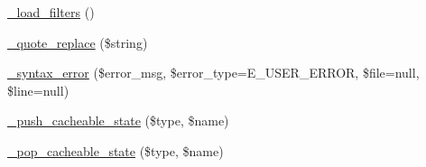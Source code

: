 \begin{DoxyCompactItemize}
\item 
\hyperlink{class_smarty___compiler_a78b7b3c8ce574b2dcfcbd48070061740}{\-\_\-load\-\_\-filters} ()
\item 
\hyperlink{class_smarty___compiler_af44c0aadf5d97fe891cc281c1de622e5}{\-\_\-quote\-\_\-replace} (\$string)
\item 
\hyperlink{class_smarty___compiler_a9cf75cd6abe553dd33660de24527d0aa}{\-\_\-syntax\-\_\-error} (\$error\-\_\-msg, \$error\-\_\-type=\-E\-\_\-\-U\-S\-E\-R\-\_\-\-E\-R\-R\-O\-R, \$file=null, \$line=null)
\item 
\hyperlink{class_smarty___compiler_a11b685691a5b572278f01ff01c31afbe}{\-\_\-push\-\_\-cacheable\-\_\-state} (\$type, \$name)
\item 
\hyperlink{class_smarty___compiler_a485abbea43510914e066dcc2f0ebbfc0}{\-\_\-pop\-\_\-cacheable\-\_\-state} (\$type, \$name)
\end{DoxyCompactItemize}
